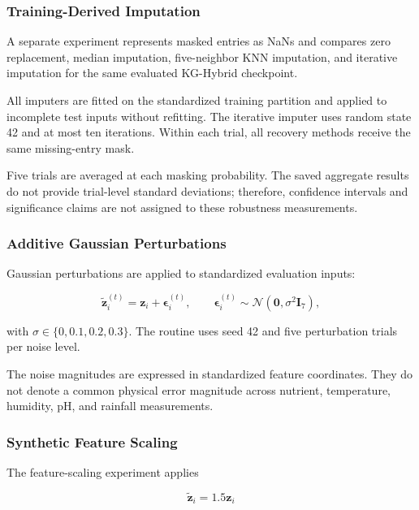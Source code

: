 \subsubsection{Training-Derived Imputation}

A separate experiment represents masked entries as NaNs and compares
zero replacement, median imputation, five-neighbor KNN imputation,
and iterative imputation for the same evaluated KG-Hybrid checkpoint.

All imputers are fitted on the standardized training partition and
applied to incomplete test inputs without refitting. The iterative
imputer uses random state 42 and at most ten iterations. Within each
trial, all recovery methods receive the same missing-entry mask.

Five trials are averaged at each masking probability. The saved
aggregate results do not provide trial-level standard deviations;
therefore, confidence intervals and significance claims are not
assigned to these robustness measurements.

\subsubsection{Additive Gaussian Perturbations}

Gaussian perturbations are applied to standardized evaluation inputs:

\begin{equation}
\widetilde{\mathbf{z}}_i^{(t)}
=
\mathbf{z}_i+\boldsymbol{\epsilon}_i^{(t)},
\qquad
\boldsymbol{\epsilon}_i^{(t)}
\sim
\mathcal{N}(\mathbf{0},\sigma^2\mathbf{I}_7),
\label{eq:robustness_noise}
\end{equation}

with $\sigma\in\{0,0.1,0.2,0.3\}$. The routine uses seed 42
and five perturbation trials per noise level.

The noise magnitudes are expressed in standardized feature
coordinates. They do not denote a common physical error magnitude
across nutrient, temperature, humidity, pH, and rainfall measurements.

\subsubsection{Synthetic Feature Scaling}

The feature-scaling experiment applies

\begin{equation}
\widetilde{\mathbf{z}}_i
=
1.5\mathbf{z}_i
\label{eq:robustness_scaling}
\end{equation}

